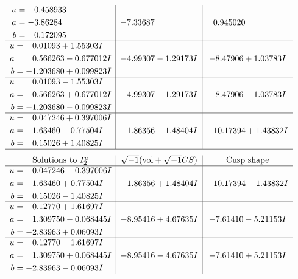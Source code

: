 \documentclass[1p]{elsarticle_modified}
\theoremstyle{definition}
\newcommand{\I}{\sqrt{-1}}
\begin{document}
$$\begin{array}{c|c|c}
\begin{aligned}
u &= -0.458933\phantom{ +0.000000I} \\
a &= -3.86284\phantom{ +0.000000I} \\
b &= \phantom{-}0.172095\phantom{ +0.000000I}\end{aligned}
 & -7.33687\phantom{ +0.000000I} & \phantom{-}0.945020\phantom{ +0.000000I} \\ \hline\begin{aligned}
u &= \phantom{-}0.01093 + 1.55303 I \\
a &= \phantom{-}0.566263 - 0.677012 I \\
b &= -1.203680 + 0.099823 I\end{aligned}
 & -4.99307 - 1.29173 I & -8.47906 + 1.03783 I \\ \hline\begin{aligned}
u &= \phantom{-}0.01093 - 1.55303 I \\
a &= \phantom{-}0.566263 + 0.677012 I \\
b &= -1.203680 - 0.099823 I\end{aligned}
 & -4.99307 + 1.29173 I & -8.47906 - 1.03783 I \\ \hline\begin{aligned}
u &= \phantom{-}0.047246 + 0.397006 I \\
a &= -1.63460 - 0.77504 I \\
b &= \phantom{-}0.15026 + 1.40825 I\end{aligned}
 & \phantom{-}1.86356 - 1.48404 I & -10.17394 + 1.43832 I\\
 \hline 
 \end{array}$$\newpage$$\begin{array}{c|c|c}  
\text{Solutions to }I^u_{2}& \I (\text{vol} + \sqrt{-1}CS) & \text{Cusp shape}\\
 \hline 
\begin{aligned}
u &= \phantom{-}0.047246 - 0.397006 I \\
a &= -1.63460 + 0.77504 I \\
b &= \phantom{-}0.15026 - 1.40825 I\end{aligned}
 & \phantom{-}1.86356 + 1.48404 I & -10.17394 - 1.43832 I \\ \hline\begin{aligned}
u &= \phantom{-}0.12770 + 1.61697 I \\
a &= \phantom{-}1.309750 - 0.068445 I \\
b &= -2.83963 + 0.06093 I\end{aligned}
 & -8.95416 + 4.67635 I & -7.61410 - 5.21153 I \\ \hline\begin{aligned}
u &= \phantom{-}0.12770 - 1.61697 I \\
a &= \phantom{-}1.309750 + 0.068445 I \\
b &= -2.83963 - 0.06093 I\end{aligned}
 & -8.95416 - 4.67635 I & -7.61410 + 5.21153 I\\
 \hline 
 \end{array}$$\newpage
\end{document}
